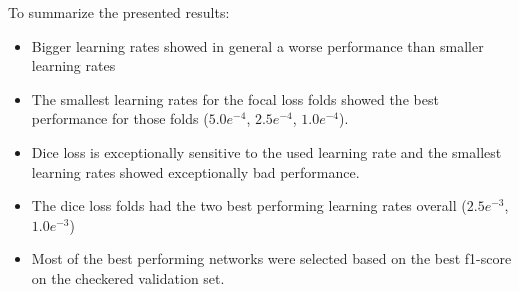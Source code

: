 To summarize the presented results:
\begin{itemize}
    \item Bigger learning rates showed in general a worse performance than smaller learning rates
    \item The smallest learning rates for the focal loss folds showed the best performance for those folds ($5.0e^{-4}$, $2.5e^{-4}$, $1.0e^{-4}$).
    \item Dice loss is exceptionally sensitive to the used learning rate and the smallest learning rates showed exceptionally bad performance.
    \item The dice loss folds had the two best performing learning rates overall ($2.5e^{-3}$, $1.0e^{-3}$)
    \item Most of the best performing networks were selected based on the best f1-score on the checkered validation set.
\end{itemize}


